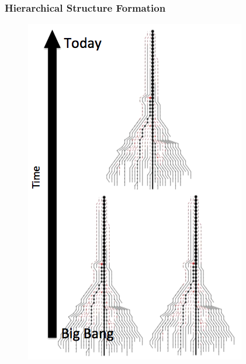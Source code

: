 \documentclass[hyperref={pdfpagelabels=false}]{beamer}
\begin{document}
\begin{frame}
  \frametitle{Hierarchical Structure Formation}
      \begin{figure}
        \includegraphics[height=0.9\textheight]{mergertree_mod2.png}
      \end{figure}  
\end{frame}
\end{document}
